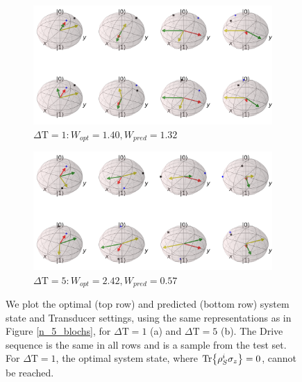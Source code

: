 \begin{figure}
	\centering
	\begin{subfigure}{0.85\textwidth}
		\centering
		\includegraphics[width=\textwidth]{img/bloch_comp_1_crop}
		\caption{$\Delta \mathrm{T} = 1: W_{opt} = 1.40, W_{pred} = 1.32$}
		\label{}
	\end{subfigure}
	\begin{subfigure}{0.85\textwidth}
		\centering
		\includegraphics[width=\textwidth]{img/bloch_comp_5_crop}
		\caption{$\Delta \mathrm{T} = 5: W_{opt} = 2.42, W_{pred} = 0.57$}
		\label{}
	\end{subfigure}
	\caption{We plot the optimal (top row) and predicted (bottom row) system state and Transducer settings, using the same representations as in Figure \ref{n_5_blochs}, for $\Delta \mathrm{T} = 1$ (a) and $\Delta \mathrm{T} = 5$ (b). The Drive sequence is the same in all rows and is a sample from the test set. For $\Delta \mathrm{T} = 1$, the optimal system state, where $\Tr{\rho_S^i \sigma_z} = 0$, cannot be reached.}
	\label{}
\end{figure}